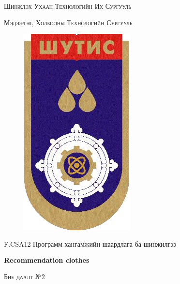 \begin{titlepage}
\begin{center}
{\scshape\large Шинжлэх Ухаан Технологийн Их Сургууль\par} %
{\scshape Мэдээлэл, Холбооны Технологийн Сургууль\par}\vspace{0.5cm} %

\begin{figure}[h]
	\centering
	\includegraphics[scale=0.2]{figures/MUST_logo}
	\label{fig:mustlogo}
\end{figure}

\vspace{1cm}
\large{F.CSA12 \hspace{0.5mm} Программ хангамжийн шаардлага ба шинжилгээ} \\

\vspace{2cm}

{\LARGE \bfseries Recommendation clothes \hspace{0.3mm} \par}\vspace{0.4cm} %
\vspace{1cm}
\textsc{\Large {Бие даалт №2}}\\
\vspace{2cm}
\begin{minipage}[t] {0.9\textwidth}
\begin{flushleft} 
\normalsize


\end{flushleft}
\end{minipage}
\end{center}
\end{titlepage}
